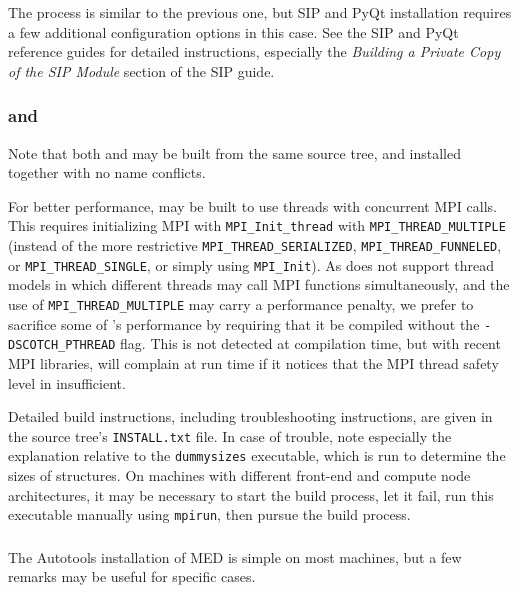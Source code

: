 \documentclass[a4paper,10pt,twoside]{csshortdoc}
\begin{document}
\begin{itemize}
      The process is similar to the previous one, but SIP and PyQt
      installation requires a few additional configuration options
      in this case. See the SIP and PyQt reference guides for
      detailed instructions, especially the \emph{Building a Private
      Copy of the SIP Module} section of the SIP guide.

\end{itemize}

\subsubsection{\scotch and \ptscotch\label{sec:ext:scotch}}

Note that both \scotch and \ptscotch may be built from the same source
tree, and installed together with no name conflicts.

For better performance, \ptscotch may be built to use threads with concurrent
MPI calls. This requires initializing MPI with \texttt{MPI\_Init\_thread}
with \texttt{MPI\_THREAD\_MULTIPLE} (instead of the more restrictive
\texttt{MPI\_THREAD\_SERIALIZED}, \texttt{MPI\_THREAD\_FUNNELED}, or
\texttt{MPI\_THREAD\_SINGLE}, or simply using \texttt{MPI\_Init}).
As \CS does not support thread models in which different threads may call
MPI functions simultaneously, and the use of \texttt{MPI\_THREAD\_MULTIPLE}
may carry a performance penalty, we prefer to sacrifice some of
\ptscotch's performance by requiring that it be compiled without the
\texttt{-DSCOTCH\_PTHREAD} flag. This is not detected at compilation time,
but with recent MPI libraries, \ptscotch will complain at run time
if it notices that the MPI thread safety level in insufficient.

Detailed build instructions, including troubleshooting instructions,
are given in the source tree's \texttt{INSTALL.txt} file.
In case of trouble, note especially the explanation relative to the
\texttt{dummysizes} executable, which is run to determine the
sizes of structures. On machines with different front-end and
compute node architectures, it may be necessary
to start the build process, let it fail, run this executable
manually using \texttt{mpirun}, then pursue the build process.

\subsubsection{\med\label{sec:ext:med}}

The Autotools installation of MED is simple on most machines,
but a few remarks may be useful for specific cases.
\end{document}
